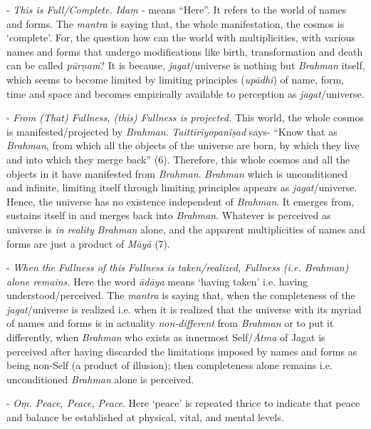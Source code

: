 - \emph{This is Full/Complete.} \emph{Idaṃ -} means ``Here''. It refers to the world of names and forms. The \emph{mantra} is saying that, the whole manifestation, the cosmos is `complete'. For, the question how can the world with multiplicities, with various names and forms that undergo modifications like birth, transformation and death can be called \emph{pūrṇam}? It is because, \emph{jagat}/universe is nothing but \emph{Brahman} itself, which seems to become limited by limiting principles (\emph{upādhi}) of name, form, time and space and becomes empirically available to perception as \emph{jagat}/universe.

- \emph{From (That) Fullness, (this) Fullness is projected.} This world, the whole cosmos is manifested/projected by \emph{Brahman}. \emph{Taittirīyopaniṣad} says- ``Know that as \emph{Brahman}, from which all the objects of the universe are born, by which they live and into which they merge back'' (6). Therefore, this whole cosmos and all the objects in it have manifested from \emph{Brahman}. \emph{Brahman} which is unconditioned and infinite, limiting itself through limiting principles appears as \emph{jagat}/universe. Hence, the universe has no existence independent of \emph{Brahman}. It emerges from, sustains itself in and merges back into \emph{Brahman}. Whatever is perceived as universe is \emph{in} \emph{reality} \emph{Brahman} alone, and the apparent multiplicities of names and forms are just a product of \emph{Māyā} (7).

- \emph{When the Fullness of this Fullness is taken/realized, Fullness (i.e. Brahman) alone remains.} Here the word \emph{ādāya} means `having taken' i.e. having understood/perceived. The \emph{mantra} is saying that, when the completeness of the \emph{jagat}/universe is realized i.e. when it is realized that the universe with its myriad of names and forms is in actuality \emph{non-different} from \emph{Brahman} or to put it differently, when \emph{Brahman} who exists as innermost Self/\emph{Ātma} of Jagat is perceived after having discarded the limitations imposed by names and forms as being non-Self (a product of illusion); then completeness alone remains i.e. unconditioned \emph{Brahman} alone is perceived.

- \emph{Oṃ. Peace, Peace, Peace}. Here `peace' is repeated thrice to indicate that peace and balance be established at physical, vital, and mental levels.

